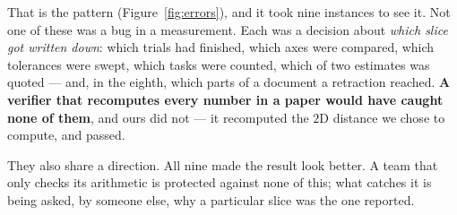 \documentclass[10pt,twocolumn]{article}
\begin{document}
That is the pattern (Figure~\ref{fig:errors}), and it took nine instances to
see it. Not one of these
was a bug in a measurement. Each was a decision about \emph{which slice got
written down}: which trials had finished, which axes were compared, which
tolerances were swept, which tasks were counted, which of two estimates was
quoted --- and, in the eighth, which parts of a document a retraction reached. \textbf{A verifier that recomputes every
number in a paper would have caught none of them}, and ours did not --- it
recomputed the $2$D distance we chose to compute, and passed.

They also share a direction. All nine made the result look better. A team
that only checks its arithmetic is protected against none of this; what
catches it is being asked, by someone else, why a particular slice was the one
reported.
\end{document}
